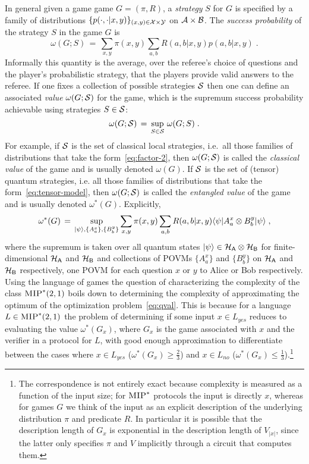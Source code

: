 In general given a game game $G=(\pi,R)$, a \emph{strategy} $S$ for $G$ is specified by a family of distributions $\{p(\cdot,\cdot | x,y)\}_{(x,y)\in \mathcal{X}\times \mathcal{Y}}$ on $\mathcal{A}\times \mathcal{B}$. The \emph{success probability} of the strategy $S$ in the game $G$ is 
\[ \omega(G;S) \,=\, \sum_{x,y} \pi(x,y) \sum_{a,b} R(a,b|x,y) p(a,b|x,y)\;.\]
Informally this quantity is the average, over the referee's choice of questions and the player's probabilistic strategy, that the players provide valid answers to the referee. 
If one fixes a collection of possible strategies $\mathcal{S}$ then one can define an associated \emph{value} $\omega(G;\mathcal{S})$ for the game, which is the supremum success probability achievable using strategies $S\in\mathcal{S}$:
\[ \omega(G;\mathcal{S}) \,=\, \sup_{S\in\mathcal{S}} \,\omega(G;S)\;.\]
For example, if $\mathcal{S}$ is the set of classical local strategies, i.e.\ all those families of distributions that take the form~\eqref{eq:factor-2}, then $\omega(G;\mathcal{S})$ is called the \emph{classical value} of the game and is usually denoted $\omega(G)$. If $\mathcal{S}$ is the set of (tensor) quantum strategies, i.e. all those families of distributions that take the form~\eqref{eq:tensor-model}, then $\omega(G;\mathcal{S})$ is called the \emph{entangled value} of the game and is usually denoted $\omega^*(G)$. Explicitly, 
\begin{equation}\label{eq:qval}
\omega^*(G) \,=\, \sup_{|\psi\rangle, \{A^x_a\},\{B^y_b\}}  \sum_{x,y} \pi(x,y) \sum_{a,b} R(a,b|x,y) \langle\psi| A^x_a \otimes B^y_b |\psi\rangle\;,
\end{equation}
where the supremum is taken over all quantum states $|\psi\rangle \in \mathcal{H}_{\textsf{A}} \otimes \mathcal{H}_{\textsf{B}}$ for finite-dimensional $\mathcal{H}_{\textsf{A}}$ and $\mathcal{H}_{\textsf{B}}$ and collections of POVMs $\{A^x_a\}$ and $\{B^y_b\}$ on $\mathcal{H}_{\textsf{A}}$ and $\mathcal{H}_{\textsf{B}}$ respectively, one POVM for each question $x$ or $y$ to Alice or Bob respectively. Using the language of games the question of characterizing the complexity of the class $\textsc{MIP}^*(2,1)$ boils down to determining the complexity of approximating the optimum of the optimization problem~\eqref{eq:qval}. This is because for a language $L\in\textsc{MIP}^*(2,1)$ the problem of determining if some input $x\in L_{yes}$ reduces to evaluating the value $\omega^*(G_x)$, where $G_x$ is the game associated with $x$ and the verifier in a protocol for $L$, with good enough approximation to  differentiate between the cases where $x\in L_{yes}$ ($\omega^*(G_x)\geq \frac{2}{3}$) and $x\in L_{no}$ ($\omega^*(G_x) \leq \frac{1}{3}$).\footnote{The correspondence is not entirely exact because complexity is measured as a function of the input size; for $\textsc{MIP}^*$ protocols the input is directly $x$, whereas for games $G$ we think of the input as an explicit description of the underlying distribution $\pi$ and predicate $R$. In particular it is possible that the description length of $G_x$ is exponential in the description length of $V_{|x|}$, since the latter only specifies $\pi$ and $V$ implicitly through a circuit that computes them.}

